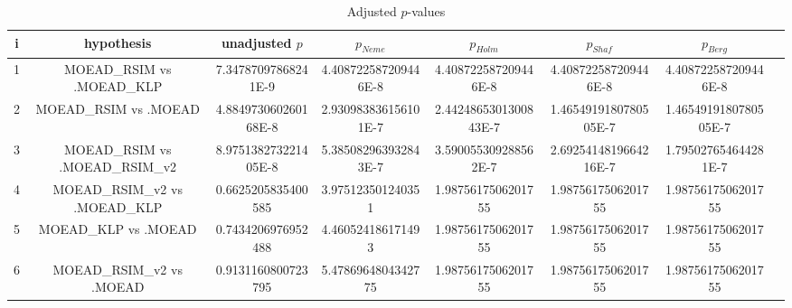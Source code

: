 \documentclass[a4paper,10pt]{article}
\begin{document}
\begin{landscape}
\begin{table}[!htp]
\centering\tiny
\caption{Adjusted $p$-values}
\begin{tabular}{cccccccc}
i&hypothesis&unadjusted $p$&$p_{Neme}$&$p_{Holm}$&$p_{Shaf}$&$p_{Berg}$\\
\hline
1&MOEAD_RSIM vs .MOEAD_KLP&7.34787097868241E-9&4.408722587209446E-8&4.408722587209446E-8&4.408722587209446E-8&4.408722587209446E-8\\
2&MOEAD_RSIM vs .MOEAD&4.884973060260168E-8&2.930983836156101E-7&2.4424865301300843E-7&1.4654919180780505E-7&1.4654919180780505E-7\\
3&MOEAD_RSIM vs .MOEAD_RSIM_v2&8.975138273221405E-8&5.385082963932843E-7&3.590055309288562E-7&2.6925414819664216E-7&1.795027654644281E-7\\
4&MOEAD_RSIM_v2 vs .MOEAD_KLP&0.6625205835400585&3.975123501240351&1.9875617506201755&1.9875617506201755&1.9875617506201755\\
5&MOEAD_KLP vs .MOEAD&0.7434206976952488&4.460524186171493&1.9875617506201755&1.9875617506201755&1.9875617506201755\\
6&MOEAD_RSIM_v2 vs .MOEAD&0.9131160800723795&5.4786964804342775&1.9875617506201755&1.9875617506201755&1.9875617506201755\\
\hline
\end{tabular}
\end{table}

\end{landscape}
\end{document}
